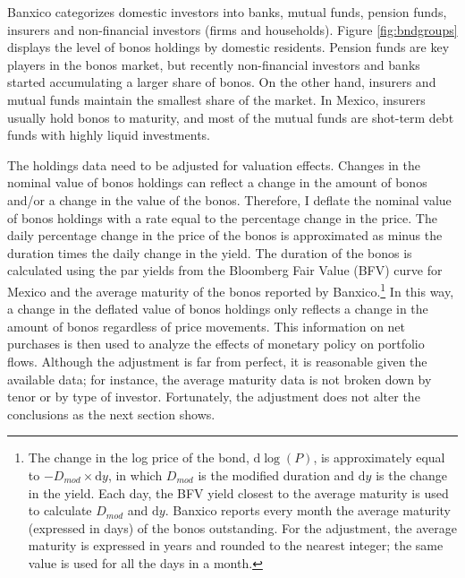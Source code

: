 {%


Banxico categorizes domestic investors into banks, mutual funds, pension funds, insurers and non-financial investors (firms and households). 
Figure \ref{fig:bndgroups} displays the level of bonos holdings by domestic residents. 
Pension funds are key players in the bonos market, but recently non-financial investors and banks started accumulating a larger share of bonos. 
On the other hand, insurers and mutual funds maintain the smallest share of the market. 
In Mexico, insurers usually hold bonos to maturity, and most of the mutual funds are shot-term debt funds with highly liquid investments.



The holdings data need to be adjusted for valuation effects. %
Changes in the nominal value of bonos holdings can reflect a change in the amount of bonos and/or a change in the value of the bonos. 
Therefore, I deflate the nominal value of bonos holdings with a rate equal to the percentage change in the price.
The daily percentage change in the price of the bonos is approximated as minus the duration times the daily change in the yield. 
The duration of the bonos is calculated using the par yields from the Bloomberg Fair Value (BFV) curve for Mexico and the average maturity of the bonos reported by Banxico.\footnote{The change in the log price of the bond, \(\mathrm{d}\log (P)\), is approximately equal to \(- D_{mod} \times \mathrm{d} y\), in which \(D_{mod}\) is the modified duration and \(\mathrm{d} y\) is the change in the yield. Each day, the BFV yield closest to the average maturity is used to calculate \(D_{mod}\) and \(\mathrm{d} y\). Banxico reports every month the average maturity (expressed in days) of the bonos outstanding. For the adjustment, the average maturity is expressed in years and rounded to the nearest integer; the same value is used for all the days in a month.} 
In this way, a change in the deflated value of bonos holdings only reflects a change in the amount of bonos regardless of price movements. 
This information on net purchases is then used to analyze the effects of monetary policy on portfolio flows. 
Although the adjustment is far from perfect, it is reasonable given the available data; for instance, the average maturity data is not broken down by tenor or by type of investor. Fortunately, %
the adjustment does not alter the conclusions as the next section shows. 


}
